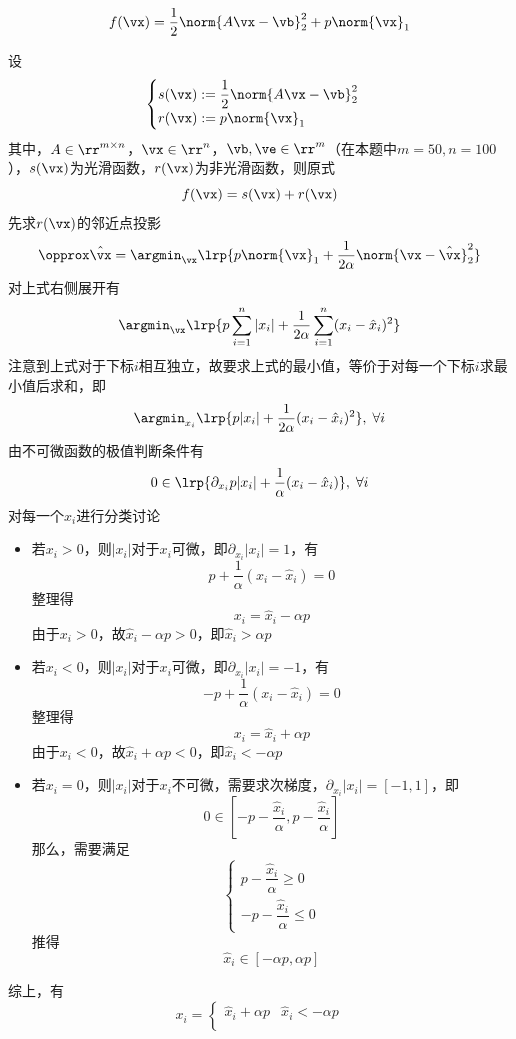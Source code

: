 \begin{example}[LASSO]
    \[f(\vx)=\frac{1}{2}\norm{A\vx-\vb}_2^2+p\norm{\vx}_1\]
\end{example}
\begin{analysis}
    设
    \[\begin{cases}
    s(\vx):=\dfrac{1}{2}\norm{A\vx-\vb}_2^2\\
    r(\vx):=p\norm{\vx}_1
    \end{cases}\]
    其中，$A\in\rr^{m\times n}$，$\vx\in\rr^n$，$\vb,\ve\in\rr^m$（在本题中$m=50,n=100$），$s(\vx)$为光滑函数，$r(\vx)$为非光滑函数，则原式
    \[f(\vx)=s(\vx)+r(\vx)\]
    先求$r(\vx)$的邻近点投影
    \[\opprox \hat{\vx}=\argmin_\vx\lrp{p\norm{\vx}_1+\frac{1}{2\alpha}\norm{\vx-\hat{\vx}}_2^2}\]
    对上式右侧展开有
    \[\argmin_\vx\lrp{p\sum_{i=1}^n|x_i|+\frac{1}{2\alpha}\sum_{i=1}^n(x_i-\hat{x}_i)^2}\]
    注意到上式对于下标$i$相互独立，故要求上式的最小值，等价于对每一个下标$i$求最小值后求和，即
    \[\argmin_{x_i}\lrp{p|x_i|+\frac{1}{2\alpha}(x_i-\hat{x}_i)^2},\;\forall i\]
    由不可微函数的极值判断条件有
    \[0\in\lrp{\partial_{x_i}p|x_i|+\frac{1}{\alpha}(x_i-\hat{x}_i)},\;\forall i\]
    对每一个$x_i$进行分类讨论
    \begin{itemize}
        \item 若$x_i>0$，则$|x_i|$对于$x_i$可微，即$\partial_{x_i}|x_i|=1$，有
        \[p+\frac{1}{\alpha}(x_i-\hat{x}_i)=0\]
        整理得
        \[x_i=\hat{x}_i-\alpha p\]
        由于$x_i>0$，故$\hat{x}_i-\alpha p>0$，即$\hat{x}_i>\alpha p$
        \item 若$x_i<0$，则$|x_i|$对于$x_i$可微，即$\partial_{x_i}|x_i|=-1$，有
        \[-p+\frac{1}{\alpha}(x_i-\hat{x}_i)=0\]
        整理得
        \[x_i=\hat{x}_i+\alpha p\]
        由于$x_i<0$，故$\hat{x}_i+\alpha p<0$，即$\hat{x}_i<-\alpha p$
        \item 若$x_i=0$，则$|x_i|$对于$x_i$不可微，需要求次梯度，$\partial_{x_i}|x_i|=[-1,1]$，即
        \[0\in\left[-p-\frac{\hat{x}_i}{\alpha},p-\frac{\hat{x}_i}{\alpha}\right]\]
        那么，需要满足
        \[\begin{cases}
        p-\dfrac{\hat{x}_i}{\alpha}\geq 0\\
        -p-\dfrac{\hat{x}_i}{\alpha}\leq 0
        \end{cases}\]
        推得
        \[\hat{x}_i\in[-\alpha p,\alpha p]\]
    \end{itemize}
    综上，有
    \[x_i=\begin{cases}
    \hat{x}_i+\alpha p & \hat{x}_i<-\alpha p\\

\end{cases}\]
\end{analysis}

